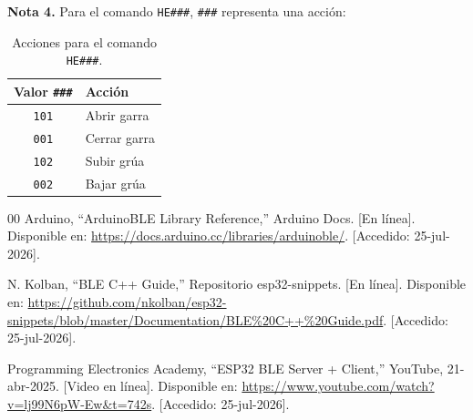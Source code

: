 \documentclass[12pt,a4paper]{article}
\begin{document}
\textbf{Nota 4.} Para el comando \texttt{HE\#\#\#}, \texttt{\#\#\#} representa una acción:

\begin{table}[H]
    \centering
    \renewcommand{\arraystretch}{1.2}
    \begin{tabularx}{0.3\textwidth}{@{} c X @{}}
        \toprule
        \textbf{Valor \texttt{\#\#\#}} & \textbf{Acción} \\
        \midrule
        \texttt{101} & Abrir garra \\
        \texttt{001} & Cerrar garra \\
        \texttt{102} & Subir grúa \\
        \texttt{002} & Bajar grúa \\
        \bottomrule
    \end{tabularx}
    \caption{Acciones para el comando \texttt{HE\#\#\#}.}
\end{table}


\begin{thebibliography}{00}
\label{sec:referencias}
Arduino, ``ArduinoBLE Library Reference,'' Arduino Docs. [En línea]. Disponible en: \url{https://docs.arduino.cc/libraries/arduinoble/}. [Accedido: 25-jul-2026].

N. Kolban, ``BLE C++ Guide,'' Repositorio esp32-snippets. [En línea]. Disponible en: \url{https://github.com/nkolban/esp32-snippets/blob/master/Documentation/BLE\%20C++\%20Guide.pdf}. [Accedido: 25-jul-2026].

Programming Electronics Academy, ``ESP32 BLE Server + Client,'' YouTube, 21-abr-2025. [Video en línea]. Disponible en: \url{https://www.youtube.com/watch?v=lj99N6pW-Ew&t=742s}. [Accedido: 25-jul-2026].
\end{thebibliography}
\end{document}
